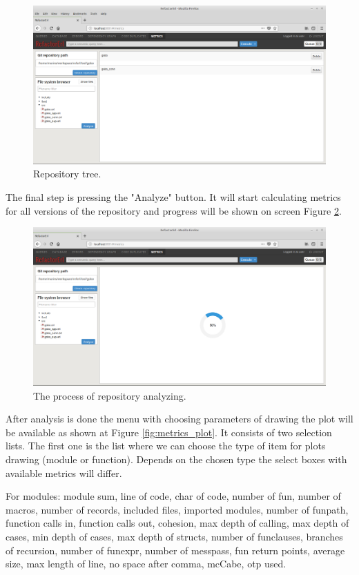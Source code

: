 \begin{figure}[ht]
	\includegraphics[width=\textwidth]{figures/files.png}
	\caption{Repository tree.}
	\label{fig:metrics_files}
\end{figure}

The final step is pressing the "Analyze" button. It will start calculating metrics for all versions of the repository and progress will be shown on screen Figure \ref{fig:metrics_analyze}. 

\begin{figure}[ht]
	\includegraphics[width=\textwidth]{figures/analyze.png}
	\caption{The process of repository analyzing.}
	\label{fig:metrics_analyze}
\end{figure}

After analysis is done the menu with choosing parameters of drawing the plot will be available as shown at Figure \ref{fig:metrics_plot}. It consists of two selection lists. The first one is the list where we can choose the type of item for plots drawing (module or function). Depends on the chosen type the select boxes with available metrics will differ. 

For modules: module sum, line of code, char of code, number of fun, number of macros, number of records, included files, imported modules, number of funpath, function calls in, function calls out, cohesion, max depth of calling, max depth of cases, min depth of cases, max depth of structs, number of funclauses, branches of recursion, number of funexpr, number of messpass, fun return points, average size, max length of line, no space after comma, mcCabe, otp used.

